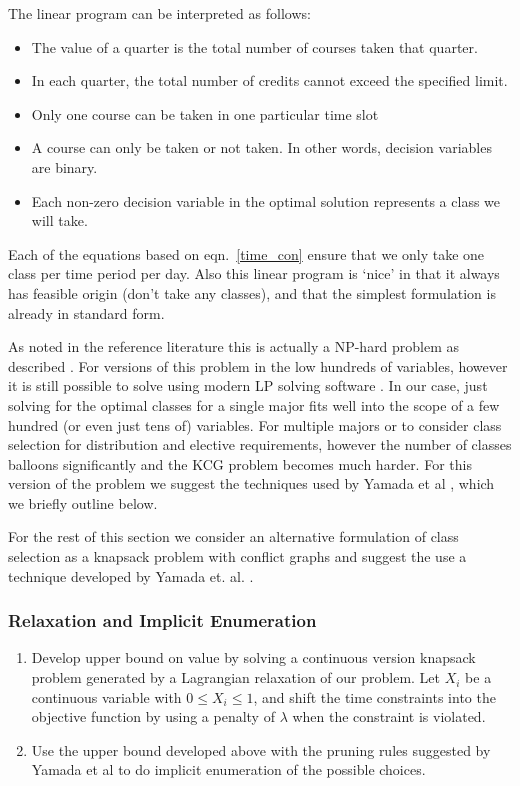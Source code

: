 \documentclass[11pt]{article} %
\begin{document}
The linear program
can be interpreted as follows: \begin{itemize} \item The value of a quarter is
the total number of courses taken that quarter.  \item In each quarter, the
total number of credits cannot exceed the specified limit.  \item Only one
course can be taken in one particular time slot \item A course can only be taken
or not taken. In other words, decision variables are binary.  \item Each
non-zero decision variable in the optimal solution represents a class we will
take.  \end{itemize}

Each of the equations based on eqn.~\ref{time_con} ensure that we only take one class per 
time period per day. Also this linear program is ‘nice’ in that it always has 
feasible origin (don’t take any classes), and that the simplest formulation 
is already in standard form.

As noted in the reference literature this is actually a NP-hard
problem as described \cite{pferschy:kcg}. For versions of this problem in the
low hundreds of variables, however it is still possible to solve using modern LP
solving software \cite{yamada:heuristic}. In our case, just solving for the
optimal classes for a single major fits well into the scope of a few hundred (or
even just tens of) variables. For multiple majors or to consider class selection
for distribution and elective requirements, however the number of classes
balloons significantly and the KCG problem becomes much harder. For this version
of the problem we suggest the techniques used by Yamada et al
\cite{yamada:heuristic}, which we briefly outline below.

For the rest of this section we consider an alternative formulation of class
selection as a knapsack problem with conflict graphs and suggest the use
a technique developed by Yamada et. al.  \cite{yamada:heuristic}.

\subsubsection{Relaxation and Implicit Enumeration} \begin{enumerate} \item
Develop upper bound on value by solving a continuous version knapsack problem
generated by a Lagrangian relaxation of our problem. Let $X_i$ be a continuous
variable with $0 \leq X_i \leq 1$, and shift the time constraints into the
objective function by using a penalty of $\lambda$ when the constraint is
violated.  \item Use the upper bound developed above with the pruning rules
suggested by Yamada et al \cite{yamada:heuristic} to do implicit enumeration of
the possible choices.  \end{enumerate}
\end{document}
